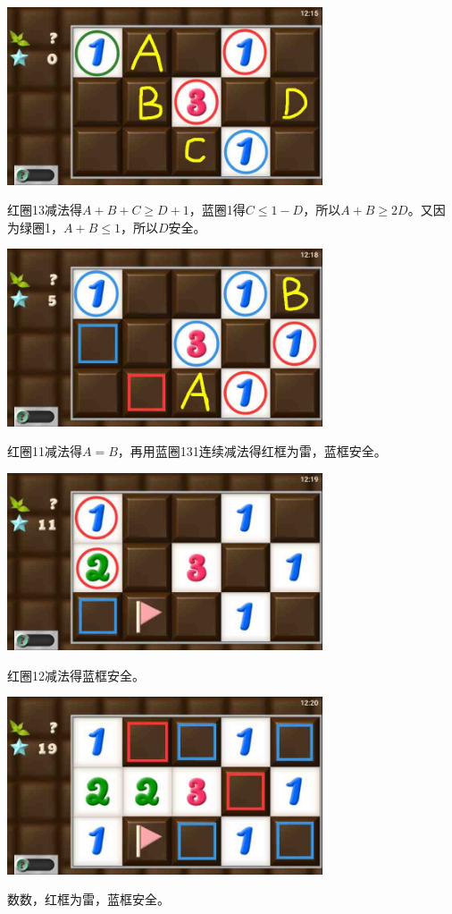 \subsection{} %
\begin{center}
    \includegraphics[width=0.7\textwidth]{puzzlelow/81-1.jpg}
\end{center}
红圈13减法得$A+B+C\ge D+1$，蓝圈1得$C\le 1-D$，所以$A+B\ge 2D$。又因为绿圈1，$A+B\le 1$，所以$D$安全。
\begin{center}
    \includegraphics[width=0.7\textwidth]{puzzlelow/81-2.jpg}
\end{center}
红圈11减法得$A=B$，再用蓝圈131连续减法得红框为雷，蓝框安全。
\begin{center}
    \includegraphics[width=0.7\textwidth]{puzzlelow/81-3.jpg}
\end{center}
红圈12减法得蓝框安全。
\begin{center}
    \includegraphics[width=0.7\textwidth]{puzzlelow/81-4.jpg}
\end{center}
数数，红框为雷，蓝框安全。


